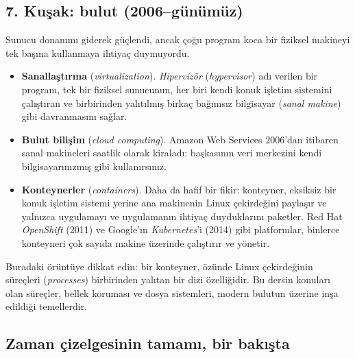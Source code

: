 \documentclass[11pt,a4paper]{article}
\newcommand{\term}[1]{\textbf{\color{mintdeep}#1}}
\begin{document}
\subsection{7. Kuşak: bulut (2006--günümüz)}

Sunucu donanımı giderek güçlendi, ancak çoğu program koca bir fiziksel makineyi tek başına kullanmaya ihtiyaç duymuyordu.

\begin{itemize}
  \item \term{Sanallaştırma} (\emph{virtualization}). \emph{Hipervizör} (\emph{hypervisor}) adı verilen bir program, tek bir fiziksel sunucunun, her biri kendi konuk işletim sistemini çalıştıran ve birbirinden yalıtılmış birkaç bağımsız bilgisayar (\emph{sanal makine}) gibi davranmasını sağlar.
  \item \term{Bulut bilişim} (\emph{cloud computing}). Amazon Web Services 2006'dan itibaren sanal makineleri saatlik olarak kiraladı: başkasının veri merkezini kendi bilgisayarınızmış gibi kullanırsınız.
  \item \term{Konteynerler} (\emph{containers}). Daha da hafif bir fikir: konteyner, eksiksiz bir konuk işletim sistemi yerine ana makinenin Linux çekirdeğini paylaşır ve yalnızca uygulamayı ve uygulamanın ihtiyaç duyduklarını paketler. Red Hat \emph{OpenShift} (2011) ve Google'ın \emph{Kubernetes}'i (2014) gibi platformlar, binlerce konteyneri çok sayıda makine üzerinde çalıştırır ve yönetir.
\end{itemize}

Buradaki örüntüye dikkat edin: bir konteyner, özünde Linux çekirdeğinin süreçleri (\emph{processes}) birbirinden yalıtan bir dizi özelliğidir. Bu dersin konuları olan süreçler, bellek koruması ve dosya sistemleri, modern bulutun üzerine inşa edildiği temellerdir.

\subsection{Zaman çizelgesinin tamamı, bir bakışta}
\end{document}
